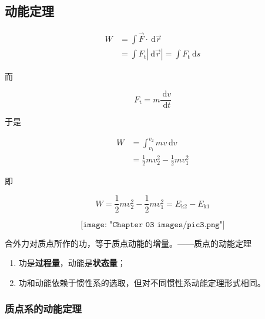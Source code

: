 \documentclass[
	12pt, %
	a4paper, %
]{myLegrandOrangeBook}
\begin{document}
    \subsection{动能定理}

    \vspace{1em}
    \begin{theorem}[质点的动能定理]

        $$
        \begin{aligned}
            W & =\int \overrightarrow{F} \cdot \mathrm{~d} \overrightarrow{r} \\
            & =\int F_{\mathrm{t}}|\mathrm{~d} \overrightarrow{r}|=\int F_{\mathrm{t}} \mathrm{~d} s
        \end{aligned}
        $$

        而

        $$
            F_{\mathrm{t}}=m \frac{\mathrm{~d} v}{\mathrm{~d} t}
        $$

        于是

        $$
            \begin{aligned}
            W & =\int_{v_1}^{v_2} m v \mathrm{~d} v \\
            & =\frac{1}{2} m v_2^2-\frac{1}{2} m v_1^2
            \end{aligned}
        $$

        即

        \begin{equation}
            W=\frac{1}{2} m v_2^2-\frac{1}{2} m v_1^2=E_{\mathrm{k} 2}-E_{\mathrm{k} 1}
        \end{equation}

        \[
            \texttt{[image: "Chapter 03 images/pic3.png"]}
            \label{pic3}
        \]

        合外力对质点所作的功，等于质点动能的增量。——质点的动能定理

    \end{theorem}

    \begin{enumerate}
        \item 功是\textbf{过程量}，动能是\textbf{状态量}；
        \item 功和动能依赖于惯性系的选取，但对不同惯性系动能定理形式相同。
    \end{enumerate}

    \subsubsection*{质点系的动能定理}
\end{document}
